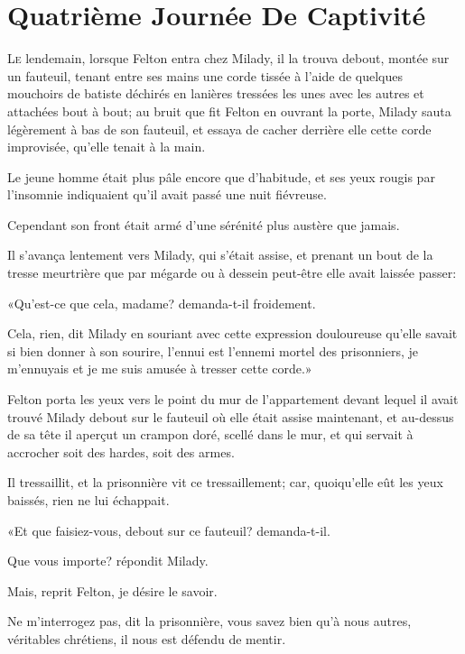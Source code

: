 
\chapter{Quatrième Journée De Captivité}

\lettrine{L}{e} lendemain, lorsque Felton entra chez Milady, il la trouva debout, montée sur un fauteuil, tenant entre ses mains une corde tissée à l'aide de quelques mouchoirs de batiste déchirés en lanières tressées les unes avec les autres et attachées bout à bout; au bruit que fit Felton en ouvrant la porte, Milady sauta légèrement à bas de son fauteuil, et essaya de cacher derrière elle cette corde improvisée, qu'elle tenait à la main. 

Le jeune homme était plus pâle encore que d'habitude, et ses yeux rougis par l'insomnie indiquaient qu'il avait passé une nuit fiévreuse. 

Cependant son front était armé d'une sérénité plus austère que jamais. 

Il s'avança lentement vers Milady, qui s'était assise, et prenant un bout de la tresse meurtrière que par mégarde ou à dessein peut-être elle avait laissée passer: 

«Qu'est-ce que cela, madame? demanda-t-il froidement. 

\speak  Cela, rien, dit Milady en souriant avec cette expression douloureuse qu'elle savait si bien donner à son sourire, l'ennui est l'ennemi mortel des prisonniers, je m'ennuyais et je me suis amusée à tresser cette corde.» 

Felton porta les yeux vers le point du mur de l'appartement devant lequel il avait trouvé Milady debout sur le fauteuil où elle était assise maintenant, et au-dessus de sa tête il aperçut un crampon doré, scellé dans le mur, et qui servait à accrocher soit des hardes, soit des armes. 

Il tressaillit, et la prisonnière vit ce tressaillement; car, quoiqu'elle eût les yeux baissés, rien ne lui échappait. 

«Et que faisiez-vous, debout sur ce fauteuil? demanda-t-il. 

\speak  Que vous importe? répondit Milady. 

\speak  Mais, reprit Felton, je désire le savoir. 

\speak  Ne m'interrogez pas, dit la prisonnière, vous savez bien qu'à nous autres, véritables chrétiens, il nous est défendu de mentir. 

